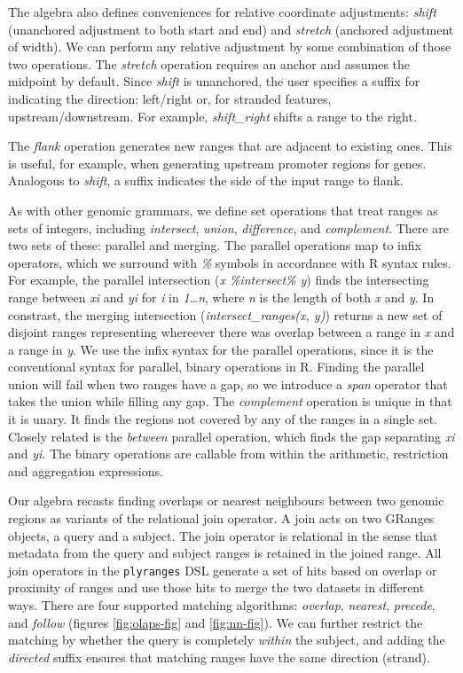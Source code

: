 \documentclass[10pt,letterpaper]{article}
\begin{document}
The algebra also defines conveniences for relative coordinate
adjustments: \emph{shift} (unanchored adjustment to both start and end)
and \emph{stretch} (anchored adjustment of width). We can perform any
relative adjustment by some combination of those two operations. The
\emph{stretch} operation requires an anchor and assumes the midpoint by
default. Since \emph{shift} is unanchored, the user specifies a suffix
for indicating the direction: left/right or, for stranded features,
upstream/downstream. For example, \emph{shift\_right} shifts a range to
the right.

The \emph{flank} operation generates new ranges that are adjacent to
existing ones. This is useful, for example, when generating upstream
promoter regions for genes. Analogous to \emph{shift}, a suffix
indicates the side of the input range to flank.

As with other genomic grammars, we define set operations that treat
ranges as sets of integers, including \emph{intersect}, \emph{union},
\emph{difference}, and \emph{complement}. There are two sets of these:
parallel and merging. The parallel operations map to infix operators,
which we surround with \emph{\%} symbols in accordance with R syntax
rules. For example, the parallel intersection (\emph{x \%intersect\% y})
finds the intersecting range between \emph{xi} and \emph{yi} for
\emph{i} in \emph{1\ldots{}n}, where \emph{n} is the length of both
\emph{x} and \emph{y}. In constrast, the merging intersection
(\emph{intersect\_ranges(x, y)}) returns a new set of disjoint ranges
representing whereever there was overlap between a range in \emph{x} and
a range in \emph{y}. We use the infix syntax for the parallel
operations, since it is the conventional syntax for parallel, binary
operations in R. Finding the parallel union will fail when two ranges
have a gap, so we introduce a \emph{span} operator that takes the union
while filling any gap. The \emph{complement} operation is unique in that
it is unary. It finds the regions not covered by any of the ranges in a
single set. Closely related is the \emph{between} parallel operation,
which finds the gap separating \emph{xi} and \emph{yi}. The binary
operations are callable from within the arithmetic, restriction and
aggregation expressions.

Our algebra recasts finding overlaps or nearest neighbours between two
genomic regions as variants of the relational join operator. A join acts
on two GRanges objects, a query and a subject. The join operator is
relational in the sense that metadata from the query and subject ranges
is retained in the joined range. All join operators in the
\texttt{plyranges} DSL generate a set of hits based on overlap or
proximity of ranges and use those hits to merge the two datasets in
different ways. There are four supported matching algorithms:
\emph{overlap}, \emph{nearest}, \emph{precede}, and \emph{follow}
(figures \ref{fig:olaps-fig} and \ref{fig:nn-fig}). We can further
restrict the matching by whether the query is completely \emph{within}
the subject, and adding the \emph{directed} suffix ensures that matching
ranges have the same direction (strand).
\end{document}
